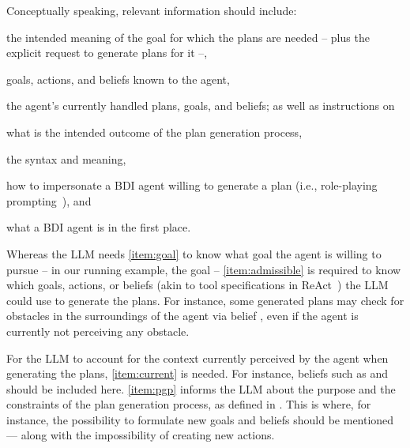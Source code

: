 Conceptually speaking,
relevant information should include:
%
\begin{enumerate*}[label=\textbf{(I\arabic*)}]
    \item\label{item:goal} the intended meaning of the goal  for which the plans are needed
    -- plus the explicit request to generate plans for it --,
    \item\label{item:admissible} goals, actions, and beliefs known to the agent,
    \item\label{item:current} the agent's currently handled plans, goals, and beliefs;
    as well as instructions on
    \item\label{item:pgp} what is the intended outcome of the plan generation process,
    \item\label{item:lang} the \agentspeak{} syntax and meaning,
    \item\label{item:task} how to impersonate a \ac{BDI} agent willing to generate a plan
    (i.e., role-playing prompting~\cite{KongZCLQSSZ23}),
    and
    \item\label{item:bdi} what a \ac{BDI} agent is in the first place.
\end{enumerate*}


Whereas the \ac{LLM} needs \ref{item:goal} to know what goal the agent is willing to pursue
-- in our running example, the goal  --
\ref{item:admissible} is required to know which goals, actions, or beliefs (akin to tool specifications in ReAct~\cite{YaoZYDSN023})
the \ac{LLM} could use to generate the plans.
%
For instance,
some generated plans may check for obstacles in the surroundings of the agent via belief ,
even if the agent is currently not perceiving any obstacle.
%

For the \ac{LLM} to account for the context currently perceived by the agent when generating the plans, \ref{item:current} is needed.
%
For instance, beliefs such as  and  should be included here.
%
\ref{item:pgp} informs the \ac{LLM} about the purpose and the constraints of the plan generation process,
as defined in .
%
This is where,
for instance,
the possibility to formulate new goals and beliefs should be mentioned---%
along with the impossibility of creating new actions.

